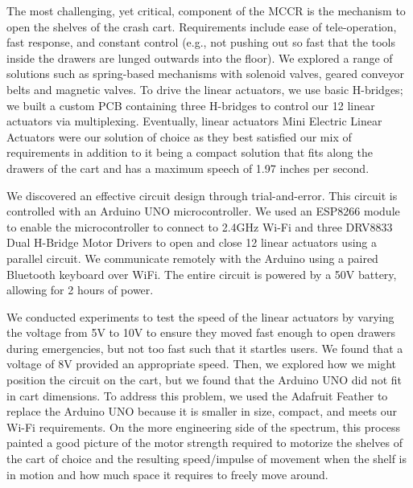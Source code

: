 The most challenging, yet critical, component of the MCCR is the mechanism to open the shelves of the crash cart. 
Requirements include ease of tele-operation, fast response, and constant control (e.g., not pushing out so fast that the tools inside the drawers are lunged outwards into the floor). 
We explored a range of solutions such as spring-based mechanisms with solenoid valves, geared conveyor belts and magnetic valves. 
To drive the linear actuators, we use basic H-bridges; we built a custom PCB containing three H-bridges to control our 12 linear actuators via multiplexing. 
Eventually, linear actuators Mini Electric Linear Actuators were our solution of choice as they best satisfied our mix of requirements in addition to it being a compact solution that fits along the drawers of the cart and has a maximum speech of 1.97 inches per second.

We discovered an effective circuit design through trial-and-error. 
This circuit is controlled with an Arduino UNO microcontroller. %
We used an ESP8266 module to enable the microcontroller to connect to 2.4GHz Wi-Fi and three DRV8833 Dual H-Bridge Motor Drivers to open and close 12 linear actuators using a parallel circuit.
We communicate remotely with the Arduino using a paired Bluetooth keyboard over WiFi.
The entire circuit is powered by a 50V battery, allowing for 2 hours of power. 

We conducted experiments to test the speed of the linear actuators by varying the voltage from 5V to 10V to ensure they moved fast enough to open drawers during emergencies, but not too fast such that it startles users. 
We found that a voltage of 8V provided an appropriate speed. 
Then, we explored how we might position the circuit on the cart, but we found that the Arduino UNO did not fit in cart dimensions.
To address this problem, we used the Adafruit Feather to replace the Arduino UNO because it is smaller in size, compact, and meets our Wi-Fi requirements.
On the more engineering side of the spectrum, this process painted a good picture of the motor strength required to motorize the shelves of the cart of choice and the resulting speed/impulse of movement when the shelf is in motion and how much space it requires to freely move around. 







